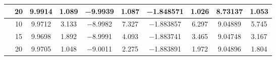 \documentclass{style/presentation}
\begin{document}
\begin{frame}
\begin{table}[!htbp]
\begin{center}
\begin{tabular}{cccccccccc}
                                                            & \num{20} & \num{9.9914}                        & \num{1.089}                            & \num{-9.9939}                       & \num{1.087}                            & \num{-1.848571}                    & \num{1.026}                            & \num{8.73137}                       & \num{1.053}                            \\
                \hline
                \rowcolor{gray!50}                          & \num{10} & \num{9.9712}                        & \num{3.133}                            & \num{-8.9982}                       & \num{7.327}                            & \num{-1.883857}                    & \num{6.297}                            & \num{9.04889}                       & \num{5.745}                            \\
                \rowcolor{gray!50}                          & \num{15} & \num{9.9698}                        & \num{1.892}                            & \num{-8.9991}                       & \num{4.093}                            & \num{-1.883741}                    & \num{3.465}                            & \num{9.04748}                       & \num{3.167}                            \\
                \rowcolor{gray!50}\multirow{-3}{*}{CLRIVFR} & \num{20} & \num{9.9705}                        & \num{1.048}                            & \num{-9.0011}                       & \num{2.275}                            & \num{-1.883891}                    & \num{1.972}                            & \num{9.04896}                       & \num{1.804}                            \\
                \hline
            \end{tabular}
        \end{center}
    \end{table}
\end{frame}
\end{document}
